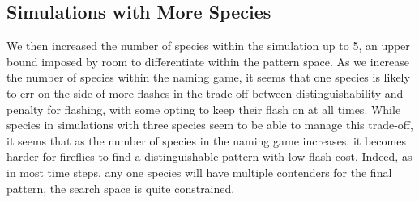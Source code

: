 \subsection{Simulations with More Species}
We then increased the number of species within the simulation up to 5, an upper bound imposed by room to differentiate within the pattern space.
As we increase the number of species within the naming game, it seems that one species is likely to err on the side of more flashes in the trade-off between distinguishability and penalty for flashing, with some opting to keep their flash on at all times. 
While species in simulations with three species seem to be able to manage this trade-off, it seems that as the number of species in the naming game increases, it becomes harder for fireflies to find a distinguishable pattern with low flash cost. 
Indeed, as in most time steps, any one species will have multiple contenders for the final pattern, the search space is quite constrained. 



